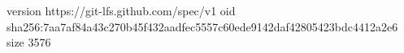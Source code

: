 version https://git-lfs.github.com/spec/v1
oid sha256:7aa7af84a43c270b45f432aadfec5557c60ede9142daf42805423bdc4412a2e6
size 3576
